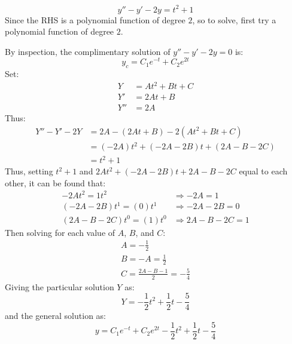 \documentclass[12pt]{article}
\begin{document}
\begin{example}
  \begin{equation*}
    y'' - y' - 2y = t^2 + 1
  \end{equation*}
  Since the RHS is a polynomial function of degree $2$, so to solve, first try a polynomial function of degree $2$.

  By inspection, the complimentary solution of $y'' - y' - 2y = 0$ is:
  \begin{equation*}
    y_c = C_1e^{-t}+C_2e^{2t}
  \end{equation*}
  Set:
  \begin{align*}
    Y &= At^2 + Bt + C \\
    Y' &= 2At + B \\
    Y'' &= 2A
  \end{align*}
  Thus:
  \begin{align*}
    Y'' - Y' - 2Y &= 2A - (2At+B) - 2\left(At^2+Bt+C\right) \\
                  &= (-2A)t^2 + (-2A-2B)t + (2A - B - 2C) \\
                  &= t^2 + 1
  \end{align*}
  Thus, setting $t^2 + 1$ and $2At^2 + (-2A-2B)t + 2A - B - 2C$ equal to each other, it can be found that:
  \begin{align*}
    -2At^2 = 1t^2         &\Rightarrow -2A = 1 \\
    (-2A-2B)t^1 = (0)t^1  &\Rightarrow -2A-2B = 0 \\
    (2A-B-2C)t^0 = (1)t^0 &\Rightarrow 2A-B-2C = 1
  \end{align*}
  Then solving for each value of $A$, $B$, and $C$:
  \begin{gather*}
    A = -\frac{1}{2} \\
    B = -A = \frac{1}{2} \\
    C = \frac{2A-B-1}{2} = -\frac{5}{4}
  \end{gather*}
  Giving the particular solution $Y$ as:
  \begin{equation*}
    Y = -\frac{1}{2}t^2 + \frac{1}{2}t - \frac{5}{4}
  \end{equation*}
  and the general solution as:
  \begin{equation*}
    y = C_1e^{-t} + C_2e^{2t} - \frac{1}{2}t^2 + \frac{1}{2}t - \frac{5}{4}
  \end{equation*}
\end{example}
\end{document}
